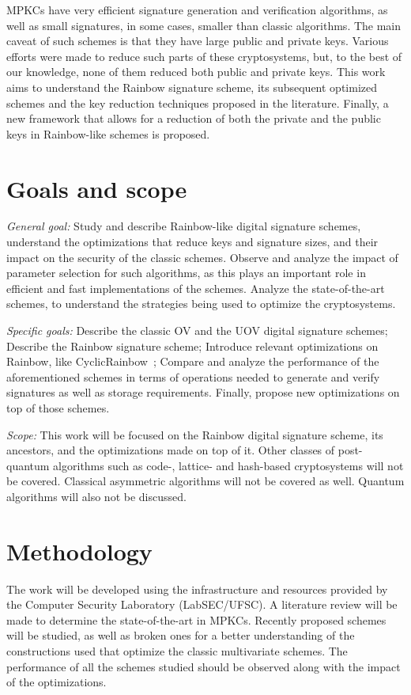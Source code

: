 \documentclass{ufsctex/ufsctex}
\begin{document}
MPKCs have very efficient signature generation and verification algorithms, as
well as small signatures, in some cases, smaller than classic algorithms. The
main caveat of such schemes is that they have large public and private keys.
Various efforts were made to reduce such parts of these cryptosystems, but, to
the best of our knowledge, none of them reduced both public and private keys.
This work aims to understand the Rainbow signature scheme, its subsequent
optimized schemes and the key reduction techniques proposed in the literature.
Finally, a new framework that allows for a reduction of both the private and
the public keys in Rainbow-like schemes is proposed.

\section{Goals and scope}

\textit{General goal:} Study and describe Rainbow-like digital signature
schemes, understand the optimizations that reduce keys and signature sizes, and
their impact on the security of the classic schemes. Observe and analyze the
impact of parameter selection for such algorithms, as this plays an important
role in efficient and fast implementations of the schemes. Analyze the
state-of-the-art schemes, to understand the strategies being used to optimize
the cryptosystems.

\textit{Specific goals:} Describe the classic OV and the UOV digital signature
schemes; Describe the Rainbow signature scheme; Introduce relevant
optimizations on Rainbow, like CyclicRainbow~\cite{petzoldt2010cyclicrainbow};
Compare and analyze the performance of the aforementioned schemes in terms of
operations needed to generate and verify signatures as well as storage
requirements. Finally, propose new optimizations on top of those schemes.

\textit{Scope:} This work will be focused on the Rainbow digital signature
scheme, its ancestors, and the optimizations made on top of it. Other classes
of post-quantum algorithms such as code-, lattice- and hash-based cryptosystems
will not be covered. Classical asymmetric algorithms will not be covered as
well. Quantum algorithms will also not be discussed.

\section{Methodology}

The work will be developed using the infrastructure and resources provided by
the Computer Security Laboratory (LabSEC/UFSC). A literature review will be
made to determine the state-of-the-art in MPKCs. Recently proposed schemes will
be studied, as well as broken ones for a better understanding of the
constructions used that optimize the classic multivariate schemes. The
performance of all the schemes studied should be observed along with the impact
of the optimizations.
\end{document}
